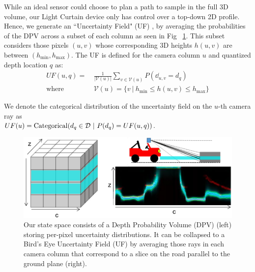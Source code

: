 While an ideal sensor could choose to plan a path to sample in the full 3D volume, our Light Curtain device only has control over a top-down 2D profile. Hence, we generate an ``Uncertainty Field" (UF) \cite{yang2019inferring}, by averaging the probabilities of the DPV across a subset of each column as seen in Fig ~\ref{fig:uf}. This subset considers those pixels $(u, v)$ whose corresponding 3D heights $h(u, v)$ are between $(h_\text{min}, h_\text{max})$. The UF is defined for the camera column $u$ and quantized depth location $q$ as:
\begin{align}
   UF(u, q) =\ &\frac{1}{|\mathcal{V}(u)|}\sum_{v \in \mathcal{V}(u)} P(\dd_{u, v} = d_q)\nonumber\\
   \text{where } &\mathcal{V}(u) = \{v\ |\ h_\text{min} \leq h(u, v) \leq h_\text{max}\} 
   \label{eq:collapse}
\end{align}

We denote the categorical distribution of the uncertainty field on the $u$-th camera ray as \\$UF(u)=\text{Categorical}(d_q \in \D\ |\ P(d_q)= UF(u, q))$. 

\begin{figure}[h]
   \centering
   \begin{minipage}{0.5\textwidth}
       \centering
       \includegraphics[width=1.0\textwidth]{figures/bev.pdf}
   \end{minipage}\hfill
   \centering
   \caption{Our state space consists of a Depth Probability Volume (DPV) (left) storing per-pixel uncertainty distributions. It can be collapsed to a Bird's Eye Uncertainty Field (UF) by averaging those rays in each camera column that correspond to a slice on the road parallel to the ground plane (right).}
   \label{fig:uf} 
\end{figure}


